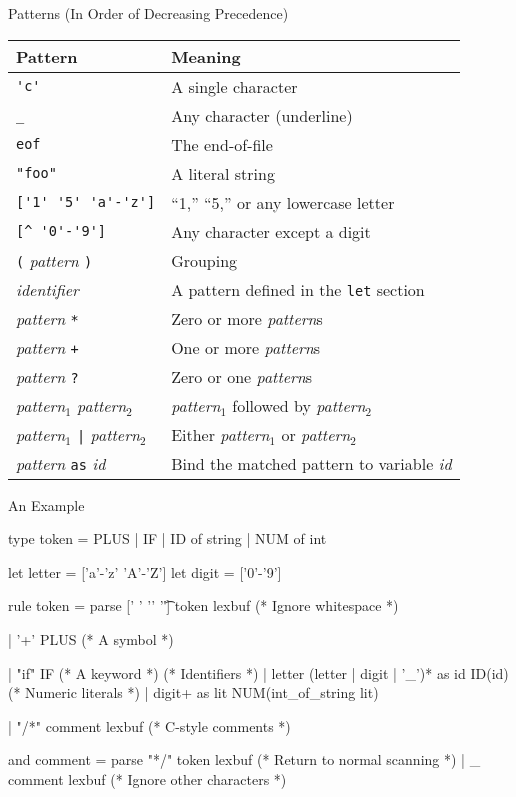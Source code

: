 \documentclass{plt}
\begin{document}
\begin{frame}[fragile]{Patterns (In Order of Decreasing Precedence)}

\begin{tabular}{ll}
\toprule
\textbf{Pattern} & \textbf{Meaning} \\
\midrule
\verb|'c'| & A single character\\
\verb|_| & Any character (underline)\\
\verb|eof| & The end-of-file\\
\verb|"foo"| & A literal string\\
\verb|['1' '5' 'a'-'z']| & ``1,'' ``5,'' or any lowercase letter\\
\verb|[^ '0'-'9']| & Any character except a digit \\
\verb|(| \emph{pattern} \verb|)| & Grouping\\
\emph{identifier} & A pattern defined in the \texttt{let} section\\
\midrule
\emph{pattern} \verb|*| & Zero or more \emph{pattern}s\\
\emph{pattern} \verb|+| & One or more \emph{pattern}s\\
\midrule
\emph{pattern} \verb|?| & Zero or one \emph{pattern}s\\
\midrule
\emph{pattern}$_1$ \emph{pattern}$_2$  & \emph{pattern}$_1$ followed by \emph{pattern}$_2$\\
\midrule
\emph{pattern}$_1$ \verb+|+ \emph{pattern}$_2$  & Either \emph{pattern}$_1$ or \emph{pattern}$_2$\\
\midrule
\emph{pattern} \verb|as| \emph{id}  & Bind the matched pattern to variable \emph{id}\\
\bottomrule
\end{tabular}

\end{frame}

\begin{frame}[fragile]{An Example}

\begin{ocamllex}
{ type token = PLUS | IF | ID of string | NUM of int }

let letter = ['a'-'z' 'A'-'Z']
let digit = ['0'-'9']

rule token =
 parse [' ' '\n' '\t'] { token lexbuf } (* Ignore whitespace *)

     | '+' { PLUS }                     (* A symbol *)

     | "if" { IF }                      (* A keyword *)
                                        (* Identifiers *)
     | letter (letter | digit | '_')* as id { ID(id) }
                                        (* Numeric literals *)
     | digit+ as lit { NUM(int_of_string lit) }

     | "/*" { comment lexbuf }          (* C-style comments *)

and comment =
  parse "*/" { token lexbuf } (* Return to normal scanning *)
      | _ { comment lexbuf }  (* Ignore other characters *)
\end{ocamllex}

\end{frame}
\end{document}
